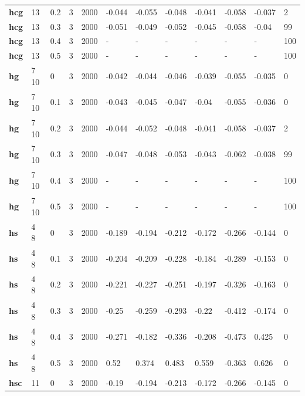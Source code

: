 \begin{longtable}[h]{|p{0.8cm}|p{1.5cm}|p{1cm}|p{1cm}|p{1cm}|p{1cm}|p{1cm}|p{1cm}|p{1cm}|p{1cm}|p{1cm}|p{1.5cm}|}
           \\
  \textbf{hcg } &  13         & 0.2 & 3 & 2000 & -0.044 & -0.055 & -0.048 & -0.041 & -0.058 & -0.037 &   2
           \\
  \textbf{hcg } &  13         & 0.3 & 3 & 2000 & -0.051 & -0.049 & -0.052 & -0.045 & -0.058 &  -0.04 &  99
           \\
  \textbf{hcg } &  13         & 0.4 & 3 & 2000 & - & - & - & - & - & - & 100
           \\
  \textbf{hcg } &  13         & 0.5 & 3 & 2000 & - & - & - & - & - & - & 100
           \\
  \textbf{hg  } &  7 10       &   0 & 3 & 2000 & -0.042 & -0.044 & -0.046 & -0.039 & -0.055 & -0.035 &   0
           \\
  \textbf{hg  } &  7 10       & 0.1 & 3 & 2000 & -0.043 & -0.045 & -0.047 &  -0.04 & -0.055 & -0.036 &   0
           \\
  \textbf{hg  } &  7 10       & 0.2 & 3 & 2000 & -0.044 & -0.052 & -0.048 & -0.041 & -0.058 & -0.037 &   2
           \\
  \textbf{hg  } &  7 10       & 0.3 & 3 & 2000 & -0.047 & -0.048 & -0.053 & -0.043 & -0.062 & -0.038 &  99
           \\
  \textbf{hg  } &  7 10       & 0.4 & 3 & 2000 & - & - & - & - & - & - & 100
           \\
  \textbf{hg  } &  7 10       & 0.5 & 3 & 2000 & - & - & - & - & - & - & 100
           \\
  \textbf{hs  } &  4 8        &   0 & 3 & 2000 & -0.189 & -0.194 & -0.212 & -0.172 & -0.266 & -0.144 &   0
           \\
  \textbf{hs  } &  4 8        & 0.1 & 3 & 2000 & -0.204 & -0.209 & -0.228 & -0.184 & -0.289 & -0.153 &   0
           \\
  \textbf{hs  } &  4 8        & 0.2 & 3 & 2000 & -0.221 & -0.227 & -0.251 & -0.197 & -0.326 & -0.163 &   0
           \\
  \textbf{hs  } &  4 8        & 0.3 & 3 & 2000 &  -0.25 & -0.259 & -0.293 &  -0.22 & -0.412 & -0.174 &   0
           \\
  \textbf{hs  } &  4 8        & 0.4 & 3 & 2000 & -0.271 & -0.182 & -0.336 & -0.208 & -0.473 &  0.425 &   0
           \\
  \textbf{hs  } &  4 8        & 0.5 & 3 & 2000 &   0.52 &  0.374 &  0.483 &  0.559 & -0.363 &  0.626 &   0
           \\
  \textbf{hsc } &  11         &   0 & 3 & 2000 &  -0.19 & -0.194 & -0.213 & -0.172 & -0.266 & -0.145 &   0

\end{longtable}
